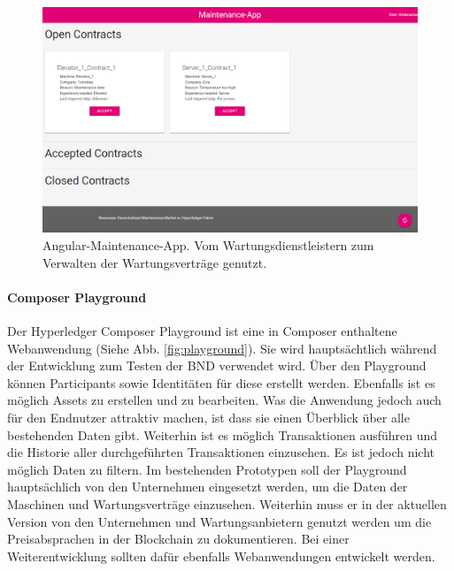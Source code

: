 \begin{figure}[!htbp]
    \centering
      \includegraphics[width=1.0\textwidth,angle=0]{images/maintenance-app}
       \caption{Angular-Maintenance-App. Vom Wartungsdienstleistern zum Verwalten der Wartungsverträge genutzt.}
      \label{fig:maintenance-app}
\end{figure}

\paragraph{Composer Playground}
Der Hyperledger Composer Playground ist eine in Composer enthaltene Webanwendung (Siehe Abb. \ref{fig:playground}). Sie wird hauptsächtlich während der Entwicklung zum Testen der BND verwendet wird. Über den Playground können Participants sowie Identitäten für diese erstellt werden. Ebenfalls ist es möglich Assets zu erstellen und zu bearbeiten. Was die Anwendung jedoch auch für den Endnutzer attraktiv machen, ist dass sie einen Überblick über alle bestehenden Daten gibt. Weiterhin ist es möglich Transaktionen ausführen und die Historie aller durchgeführten Transaktionen einzusehen. Es ist jedoch nicht möglich Daten zu filtern. Im bestehenden Prototypen soll der Playground hauptsächlich von den Unternehmen eingesetzt werden, um die Daten der Maschinen und Wartungsverträge einzusehen. Weiterhin muss er in der aktuellen Version von den Unternehmen und Wartungsanbietern genutzt werden um die Preisabsprachen in der Blockchain zu dokumentieren. Bei einer Weiterentwicklung sollten dafür ebenfalls Webanwendungen entwickelt werden.

